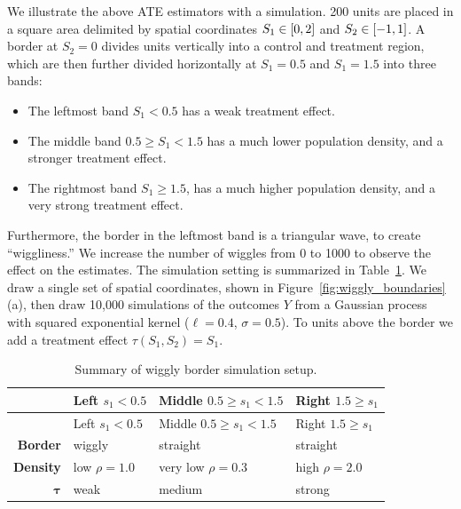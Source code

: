 \documentclass[letter]{article}
\providecommand{\tightlist}{%
      \setlength{\itemsep}{0pt}\setlength{\parskip}{0pt}}
\DeclarePairedDelimiter{\curlybracket}{\lbrack}{\rbrack}
\newcommand{\cbr}[1]{\curlybracket*{#1}}
\newcommand{\taubold}{\bm{\tau}}
\providecommand{\tightlist}{%
  	  \setlength{\itemsep}{0pt}\setlength{\parskip}{0pt}}
\begin{document}
We illustrate the above ATE estimators with a simulation.
200 units are placed in a square area delimited by spatial coordinates \(S_1 \in \cbr{0,2}\) and \(S_2 \in \cbr{-1, 1}\).
A border at \(S_2=0\) divides units vertically into a control and treatment region,
which are then further divided horizontally at \(S_1=0.5\) and \(S_1=1.5\) into three bands:

\begin{itemize}
\tightlist
\item
  The leftmost band \(S_1 < 0.5\) has a weak treatment effect.
\item
  The middle band \(0.5 \ge S_1 < 1.5\) has a much lower population density, and a stronger treatment effect.
\item
  The rightmost band \(S_1 \ge 1.5\), has a much higher population density, and a very strong treatment effect.
\end{itemize}

Furthermore, the border in the leftmost band is a triangular wave, to create ``wiggliness.''
We increase the number of wiggles from 0 to 1000 to observe the effect on the estimates.
The simulation setting is summarized in Table~\ref{table:wiggly_setup}.
We draw a single set of spatial coordinates, shown in Figure~\ref{fig:wiggly_boundaries}(a), then draw 10,000 simulations of the outcomes \(Y\) from a Gaussian process with squared exponential kernel (\(\ell=0.4\), \(\sigma=0.5\)).
To units above the border we add a treatment effect \(\tau(S_1, S_2) = S_1\).
    


    	\begin{longtable}[]{@{}rlll@{}}
\caption{Summary of wiggly border simulation setup. \label{table:wiggly_setup}}\tabularnewline
\toprule
& Left \(s_1< 0.5\) & Middle \(0.5 \ge s_1 < 1.5\) & Right \(1.5 \ge s_1\)\tabularnewline
\midrule
\endfirsthead
\toprule
& Left \(s_1< 0.5\) & Middle \(0.5 \ge s_1 < 1.5\) & Right \(1.5 \ge s_1\)\tabularnewline
\midrule
\endhead
\textbf{Border} & wiggly & straight & straight\tabularnewline
\textbf{Density} & low \(\rho=1.0\) & very low \(\rho=0.3\) & high \(\rho=2.0\)\tabularnewline
\(\taubold\) & weak & medium & strong\tabularnewline
\bottomrule
\end{longtable}
    
\end{document}
